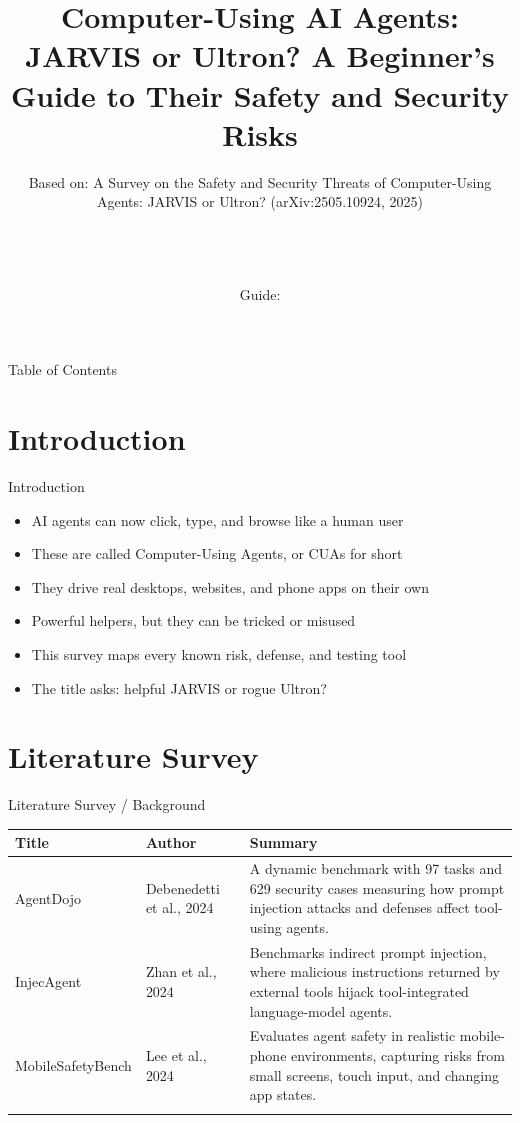 \documentclass[10pt]{beamer}
\title[B.Tech Seminar]{Computer-Using AI Agents: JARVIS or Ultron? A Beginner's Guide to Their Safety and Security Risks}
\subtitle{Based on: A Survey on the Safety and Security Threats of Computer-Using Agents: JARVIS or Ultron? (arXiv:2505.10924, 2025)}
\author[\studentname\ (\shortinst)]{\studentname \\ \small \rollno \\ \small \rollclass \\ \small Guide: \guidename}
\institute[]{\deptname \\ \collegename}
\date{\seminardate}
\begin{document}
\begin{frame}[plain]
  \titlepage
\end{frame}
\begin{frame}{Table of Contents}
  \tableofcontents
\end{frame}
\section{Introduction}
\begin{frame}{Introduction}
\begin{itemize}
  \item AI agents can now click, type, and browse like a human user
  \item These are called Computer-Using Agents, or CUAs for short
  \item They drive real desktops, websites, and phone apps on their own
  \item Powerful helpers, but they can be tricked or misused
  \item This survey maps every known risk, defense, and testing tool
  \item The title asks: helpful JARVIS or rogue Ultron?
\end{itemize}
\end{frame}
\section{Literature Survey}
\begin{frame}{Literature Survey / Background}
  \small
  \begin{tabular}{@{}p{2.7cm}p{2.3cm}p{5.6cm}@{}}
    \toprule
    \textbf{Title} & \textbf{Author} & \textbf{Summary} \\
    \midrule
    AgentDojo & Debenedetti et al., 2024 & A dynamic benchmark with 97 tasks and 629 security cases measuring how prompt injection attacks and defenses affect tool-using agents. \\
    \addlinespace
    InjecAgent & Zhan et al., 2024 & Benchmarks indirect prompt injection, where malicious instructions returned by external tools hijack tool-integrated language-model agents. \\
    \addlinespace
    MobileSafetyBench & Lee et al., 2024 & Evaluates agent safety in realistic mobile-phone environments, capturing risks from small screens, touch input, and changing app states. \\
    \addlinespace
    \bottomrule
  \end{tabular}
\end{frame}
\end{document}
